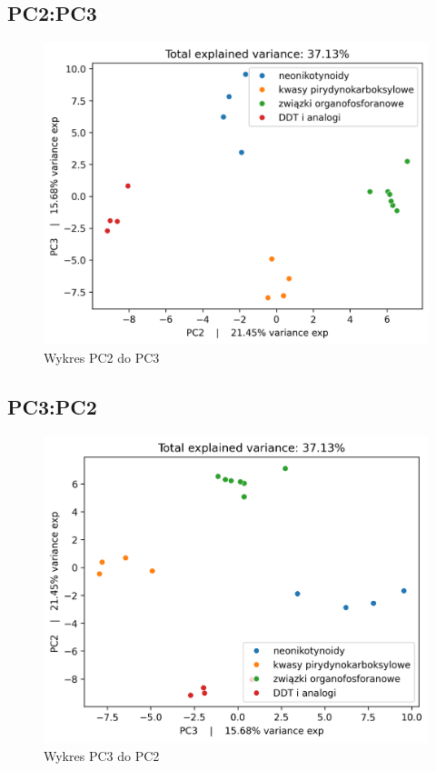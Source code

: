 \documentclass[12pt, a4paper]{article}
\begin{document}
    \subsection*{PC2:PC3}
        \begin{figure}[H]
            \centering
            \includegraphics{23.png}
            \caption{Wykres PC2 do PC3}
        \end{figure}

    \subsection*{PC3:PC2}
        \begin{figure}[H]
            \centering
            \includegraphics{32.png}
            \caption{Wykres PC3 do PC2}
        \end{figure}
\end{document}
